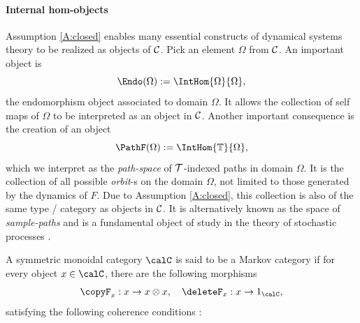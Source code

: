 \documentclass[12pt,oneside,pb-diagram]{article}
\begin{document}
\paragraph{Internal hom-objects} Assumption \ref{A:closed} enables many essential constructs of dynamical systems theory to be realized as objects of $\operatorname{\mathcal{C}}$. Pick an element $\Omega$ from $\operatorname{\mathcal{C}}$. An important object is
%
\begin{equation} \label{eqn:def:Endo}
	\Endo (\Omega) := \IntHom{\Omega}{\Omega} ,
\end{equation}
%
the {endomorphism} object associated to domain $\Omega$. It allows the collection of self maps of $\Omega$ to be interpreted as an object in $\operatorname{\mathcal{C}}$. Another important consequence is the creation of an object 
%
\begin{equation} \label{eqn:def:Path:1}
	\PathF(\Omega) := \IntHom{\TimeB}{\Omega} ,
\end{equation}
%
which we interpret as the \emph{path-space} of $\mathcal{T}$-indexed paths in domain $\Omega$. It is the collection of all possible \emph{orbit}-s on the domain $\Omega$, not limited to those generated by the dynamics of $F$. Due to Assumption \ref{A:closed}, this collection is also of the same type / category as objects in $\operatorname{\mathcal{C}}$. It is alternatively known as the space of  \emph{sample-paths} and is a fundamental object of study in the theory of stochastic processes \cite[e.g.]{Doob1953book}.

\begin{definition} 
	\cite[Def 2.1]{fritz2020Stoch} A symmetric monoidal category $\calC$ is said to be a Markov category if for every object $x\in \calC$, there are the following morphisms
	\[ \copyF_x : x \to x\otimes x , \quad \deleteF_x : x \to 1_{\calC} , \]
	satisfying the following coherence conditions :
\end{definition}
\end{document}
